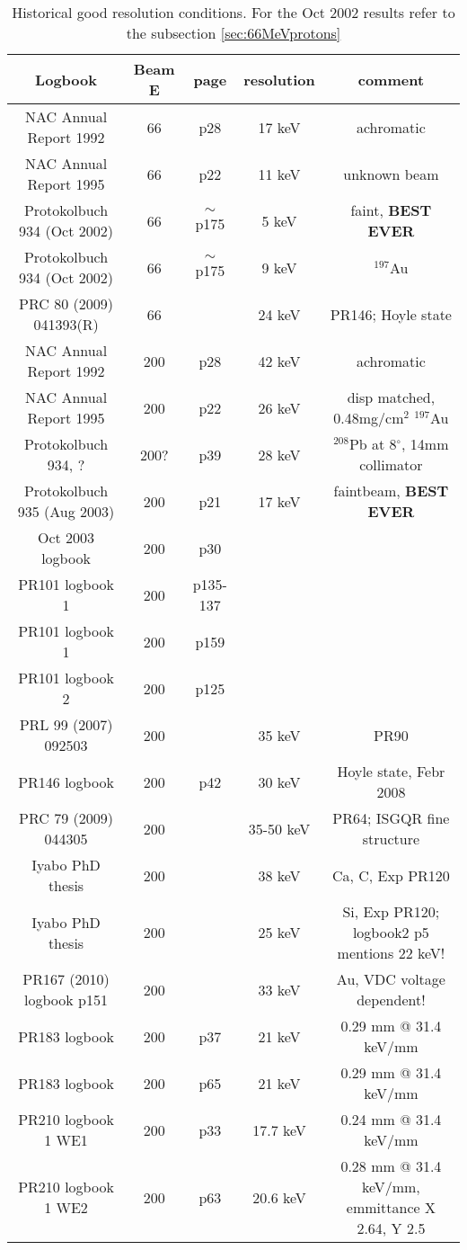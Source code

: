 \documentclass[11pt]{report}
\begin{document}
\begin{landscape}

\begin{table}[!ht]
\centering
\begin{tabular}{|c|c|c|c|c|}
\hline
Logbook & Beam E & page & resolution & comment\\ 
\hline
\hline
NAC Annual Report 1992     & 66  & p28 & 17 keV & achromatic\\
NAC Annual Report 1995     & 66  & p22 & 11 keV & unknown beam \\
Protokolbuch 934 (Oct 2002)& 66  & $\sim$p175 & 5 keV & faint, {\bf BEST EVER}\\
Protokolbuch 934 (Oct 2002)& 66  & $\sim$p175 & 9 keV & $^{197}$Au \\
PRC 80 (2009) 041393(R)    & 66  &      & 24 keV & PR146; Hoyle state \\
\hline
NAC Annual Report 1992     & 200 & p28  & 42 keV & achromatic \\
NAC Annual Report 1995     & 200 & p22  & 26 keV & disp matched, 0.48mg/cm$^2$ $^{197}$Au\\
Protokolbuch 934, ?        & 200?& p39  & 28 keV & $^{208}$Pb at 8$^{\circ}$, 14mm collimator\\
Protokolbuch 935 (Aug 2003)& 200 & p21  & 17 keV & faintbeam, {\bf BEST EVER}\\
Oct 2003 logbook           & 200 & p30  &        & \\
PR101 logbook 1            & 200 & p135-137 &    & \\
PR101 logbook 1            & 200 & p159 &        & \\
PR101 logbook 2            & 200 & p125 &        & \\
PRL 99 (2007)  092503      & 200 &      & 35 keV & PR90 \\
PR146 logbook              & 200 & p42  & 30 keV & Hoyle state, Febr 2008 \\ 
PRC 79 (2009) 044305       & 200 &      & 35-50 keV & PR64; ISGQR fine structure \\
Iyabo PhD thesis           & 200 &      & 38 keV & Ca, C, Exp PR120 \\
Iyabo PhD thesis           & 200 &      & 25 keV & Si, Exp PR120; logbook2 p5 mentions 22 keV!\\
PR167 (2010) logbook p151  & 200 &      & 33 keV & Au, VDC voltage dependent! \\
PR183 logbook		   & 200 & p37  & 21 keV & 0.29 mm @ 31.4 keV/mm\\
PR183 logbook		   & 200 & p65  & 21 keV & 0.29 mm @ 31.4 keV/mm\\
PR210 logbook 1 WE1	   & 200 & p33  & 17.7 keV & 0.24 mm @ 31.4 keV/mm\\
PR210 logbook 1 WE2	   & 200 & p63  & 20.6 keV & 0.28 mm @ 31.4 keV/mm, emmittance X 2.64, Y 2.5\\


\hline
\end{tabular}
\caption{Historical good resolution conditions. For the Oct 2002 results refer 
to the subsection \ref{sec:66MeVprotons}}
\label{table:goodresolution}
\end{table}

\end{landscape}
\end{document}
